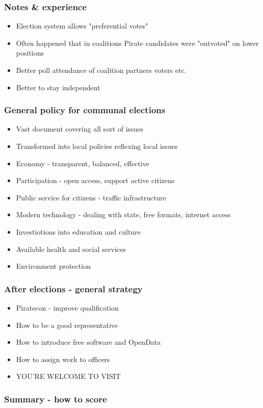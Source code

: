 \begin{frame}
	\frametitle{Notes \& experience}
	\begin{itemize}
		\item Election system allows "preferential votes"
		\item Often happened that in coalitions Pirate candidates were "outvoted" on lower positions
		\item Better poll attendance of coalition partners voters etc.
		\item Better to stay independent
	\end{itemize}
\end{frame}
\begin{frame}
	\frametitle{General policy for communal elections}
	\begin{itemize}
		\item Vast document covering all sort of issues
		\item Transformed into local policies reflexing local issues
		\item Economy - transparent, balanced, effective
		\item Participation - open access, support active citizens
		\item Public service for citizens - traffic infrastructure
		\item Modern technology - dealing with state, free formats, internet access
		\item Investiotions into education and culture
		\item Available health and social services
		\item Environment protection
	\end{itemize}
\end{frame}
\begin{frame}
	\frametitle{After elections - general strategy}
	\begin{itemize}
		\item Piratecon - improve qualification
		\item How to be a good representative
		\item How to introduce free software and OpenData
		\item How to assign work to officers
		\item YOU'RE WELCOME TO VISIT
	\end{itemize}
\end{frame}
\begin{frame}
	\frametitle{Summary - how to score}
\end{frame}